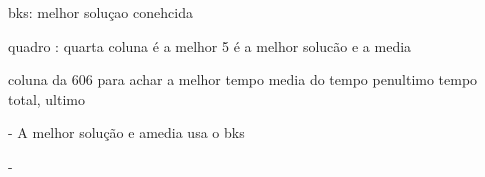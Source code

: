 bks: melhor soluçao conehcida

quadro : quarta coluna é a melhor 
         5 é a melhor solucão e a media

coluna da 606 para achar a melhor tempo 
media do tempo penultimo 
tempo total, ultimo 

- A melhor solução e amedia usa o bks

- 